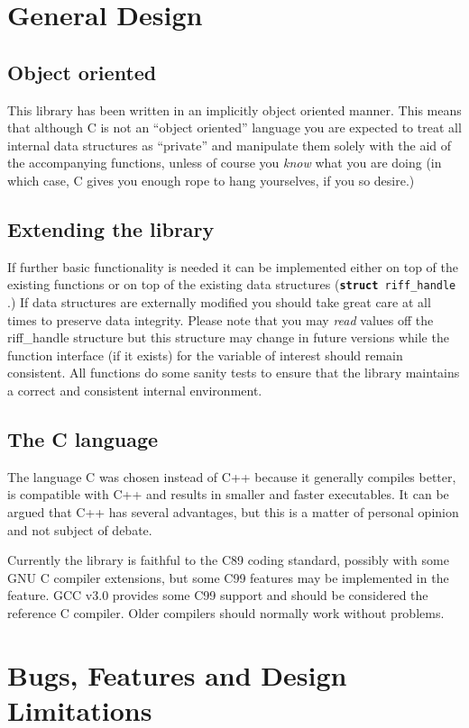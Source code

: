 \documentclass[12pt, a4paper]{article}
\begin{document}
\section{General Design}
\subsection{Object oriented}
 This library has been written in an implicitly object oriented manner.
This means that although C is not an ``object oriented'' language you are
expected to treat all internal data structures as ``private'' and manipulate
them solely with the aid of the accompanying functions, unless of
course you \emph{know} what you are doing (in which case, C gives you enough
rope to hang yourselves, if you so desire.) 

\subsection{Extending the library}
If further basic functionality is needed it can be implemented either on top
of the existing functions or on top of the existing data structures
(\texttt{{\bf struct} riff\_handle} .) If data structures are externally
modified you should take great care at all times to preserve data integrity.
Please note that you may \emph{read} values off the riff\_handle structure
but this structure may change in future versions while the function interface 
(if it exists) for the variable of interest should remain consistent. 
All functions do some sanity tests to ensure that the library maintains a correct 
and consistent internal environment. 

\subsection{The C language}
 The language C was chosen instead of C++ because it generally compiles better,
is compatible with C++ and results in smaller and faster executables. It can
be argued that C++ has several advantages, but this is a matter of personal opinion
and not subject of debate.

 Currently the library is faithful to the C89 coding standard, possibly with some
GNU C compiler extensions, but some C99 features may be implemented in the feature.
GCC v3.0 provides some C99 support and should be considered the reference 
C compiler. Older compilers should normally work without problems.

\section{Bugs, Features and Design Limitations} 
\end{document}
